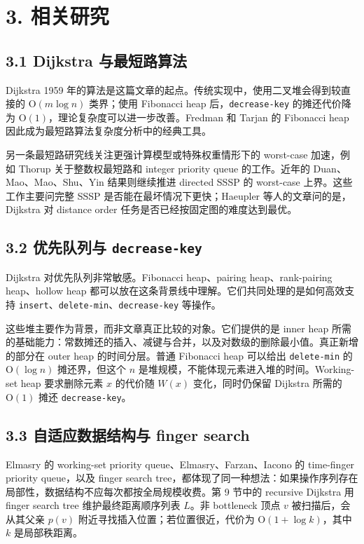 \section*{3. 相关研究}
\subsection*{3.1 Dijkstra 与最短路算法}
Dijkstra 1959 年的算法是这篇文章的起点。传统实现中，使用二叉堆会得到较直接的 \(\mathrm{O}(m\log n)\) 类界；使用 Fibonacci heap 后，\texttt{decrease-\allowbreak{}key} 的摊还代价降为 \(\mathrm{O}(1)\)，理论复杂度可以进一步改善。Fredman 和 Tarjan 的 Fibonacci heap 因此成为最短路算法复杂度分析中的经典工具。

另一条最短路研究线关注更强计算模型或特殊权重情形下的 worst-case 加速，例如 Thorup 关于整数权最短路和 integer priority queue 的工作。近年的 Duan、Mao、Mao、Shu、Yin 结果则继续推进 directed SSSP 的 worst-case 上界。这些工作主要问完整 SSSP 是否能在最坏情况下更快；Haeupler 等人的文章问的是，Dijkstra 对 distance order 任务是否已经按固定图的难度达到最优。

\subsection*{3.2 优先队列与 \texttt{decrease-\allowbreak{}key}}
Dijkstra 对优先队列非常敏感。Fibonacci heap、pairing heap、rank-pairing heap、hollow heap 都可以放在这条背景线中理解。它们共同处理的是如何高效支持 \texttt{insert}、\texttt{delete-\allowbreak{}min}、\texttt{decrease-\allowbreak{}key} 等操作。

这些堆主要作为背景，而非文章真正比较的对象。它们提供的是 inner heap 所需的基础能力：常数摊还的插入、减键与合并，以及对数级的删除最小值。真正新增的部分在 outer heap 的时间分层。普通 Fibonacci heap 可以给出 \texttt{delete-\allowbreak{}min} 的 \(\mathrm{O}(\log n)\) 摊还界，但这个 \(n\) 是堆规模，不能体现元素进入堆的时间。Working-set heap 要求删除元素 \(x\) 的代价随 \(W(x)\) 变化，同时仍保留 Dijkstra 所需的 \(\mathrm{O}(1)\) 摊还 \texttt{decrease-\allowbreak{}key}。

\subsection*{3.3 自适应数据结构与 finger search}
Elmasry 的 working-set priority queue、Elmasry、Farzan、Iacono 的 time-finger priority queue，以及 finger search tree，都体现了同一种想法：如果操作序列存在局部性，数据结构不应每次都按全局规模收费。第 9 节中的 recursive Dijkstra 用 finger search tree 维护最终距离顺序列表 \(L\)。非 bottleneck 顶点 \(v\) 被扫描后，会从其父亲 \(p(v)\) 附近寻找插入位置；若位置很近，代价为 \(\mathrm{O}(1+\log k)\)，其中 \(k\) 是局部秩距离。

